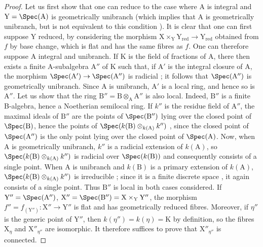\begin{proof}
Let us first show that one can reduce to the case where A is integral and $\mathrm{Y}=\Spec(\mathrm{A})$ is geometrically unibranch  (which implies that A is geometrically unibranch, but is not equivalent to this condition ).
It is clear that one can first suppose Y reduced, by considering the morphism $\mathrm{X}\times_{\mathrm{Y}}\mathrm{Y}_{\mathrm{red}}\to\mathrm{Y}_{\mathrm{red}}$ obtained from $f$ by base change, which is flat and has the same fibres as $f$.
One can therefore suppose A integral and unibranch.
If K is the field of fractions of A, there then exists a finite A-subalgebra $\mathrm{A}''$ of K such that, if $\mathrm{A}'$ is the integral closure of A, the morphism $\Spec(\mathrm{A}')\to\Spec(\mathrm{A}'')$ is radicial ; it follows  that $\Spec(\mathrm{A}'')$ is geometrically unibranch.
Since A is unibranch, $\mathrm{A}'$ is a local ring, and hence so is $\mathrm{A}''$.
Let us show that the ring $\mathrm{B}''=\mathrm{B}\otimes_{\mathrm{A}}\mathrm{A}''$ is also local.
Indeed, $\mathrm{B}''$ is a finite B-algebra, hence a Noetherian semilocal ring.
If $k''$ is the residue field of $\mathrm{A}''$, the maximal ideals of $\mathrm{B}''$ are the points of $\Spec(\mathrm{B}'')$ lying over the closed point of $\Spec(\mathrm{B})$, hence the points of $\Spec(k(\mathrm{B})\otimes_{k(\mathrm{A})}k'')$ ,
since the closed point of $\Spec(\mathrm{A}'')$ is the only point lying over the closed point of $\Spec(\mathrm{A})$.
Now, when A is geometrically unibranch, $k''$ is a radicial extension of $k(\mathrm{A})$, so $\Spec(k(\mathrm{B})\otimes_{k(\mathrm{A})}k'')$ is radicial over $\Spec(k(\mathrm{B}))$ and consequently consists of a single point.
When A is unibranch and $k(\mathrm{B})$ is a primary extension of $k(\mathrm{A})$, $\Spec(k(\mathrm{B})\otimes_{k(\mathrm{A})}k'')$ is irreducible ; since it is a finite discrete space , it again consists of a single point.
Thus $\mathrm{B}''$ is local in both cases considered.
If $\mathrm{Y}''=\Spec(\mathrm{A}'')$, $\mathrm{X}''=\Spec(\mathrm{B}'')=\mathrm{X}\times_{\mathrm{Y}}\mathrm{Y}''$, the morphism $f''=f_{(\mathrm{Y}'')}:\mathrm{X}''\to\mathrm{Y}''$ is flat and has geometrically reduced fibres.
Moreover, if $\eta''$ is the generic point of $\mathrm{Y}''$, then $k(\eta'')=k(\eta)=\mathrm{K}$ by definition, so the fibres $\mathrm{X}_\eta$ and $\mathrm{X}''_{\eta''}$ are isomorphic.
It therefore suffices to prove that $\mathrm{X}''_{\eta''}$ is connected.
\end{proof}


